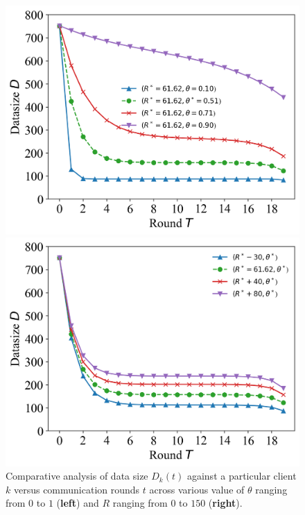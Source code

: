 \documentclass{article}
\theoremstyle{plain}
\theoremstyle{definition}
\theoremstyle{remark}
\begin{document}
\begin{figure}
	\begin{minipage}{0.49\linewidth}
		\centerline{\includegraphics[width=\textwidth]{figures/figure_63_B.png}}
	\end{minipage}
	\begin{minipage}{0.49\linewidth}
		\centerline{\includegraphics[width=\textwidth]{figures/figure_72_B.png}}
	\end{minipage}
	\caption{Comparative analysis of data size $D_k(t)$ against a particular client $k$ versus communication rounds $t$ across various value of $\theta$ ranging from $0$ to $1$ (\textbf{left}) and $R$ ranging from $0$ to $150$ (\textbf{right}).}
  \label{fig:server_datasize}
\end{figure}
\end{document}
